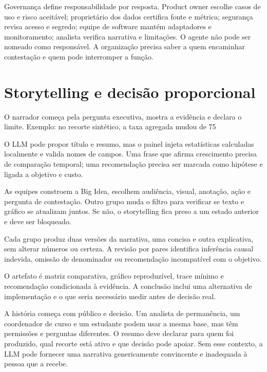 Governança define responsabilidade por resposta. Product owner escolhe casos de uso e risco aceitável; proprietário dos dados certifica fonte e métrica; segurança revisa acesso e segredo; equipe de software mantém adaptadores e monitoramento; analista verifica narrativa e limitações. O agente não pode ser nomeado como responsável. A organização precisa saber a quem encaminhar contestação e quem pode interromper a função.

\section{Storytelling e decisão proporcional}

O narrador começa pela pergunta executiva, mostra a evidência e declara o limite. Exemplo: no recorte sintético, a taxa agregada mudou de 75%

O LLM pode propor título e resumo, mas o painel injeta estatísticas calculadas localmente e valida nomes de campos. Uma frase que afirma crescimento precisa de comparação temporal; uma recomendação precisa ser marcada como hipótese e ligada a objetivo e custo.

As equipes constroem a Big Idea, escolhem audiência, visual, anotação, ação e pergunta de contestação. Outro grupo muda o filtro para verificar se texto e gráfico se atualizam juntos. Se não, o storytelling fica preso a um estado anterior e deve ser bloqueado.

Cada grupo produz duas versões da narrativa, uma concisa e outra explicativa, sem alterar números ou certeza. A revisão por pares identifica inferência causal indevida, omissão de denominador ou recomendação incompatível com o objetivo.

O artefato é matriz comparativa, gráfico reproduzível, trace mínimo e recomendação condicionada à evidência. A conclusão inclui uma alternativa de implementação e o que seria necessário medir antes de decisão real.

A história começa com público e decisão. Um analista de permanência, um coordenador de curso e um estudante podem usar a mesma base, mas têm permissões e perguntas diferentes. O resumo deve declarar para quem foi produzido, qual recorte está ativo e que decisão pode apoiar. Sem esse contexto, a LLM pode fornecer uma narrativa genericamente convincente e inadequada à pessoa que a recebe.


